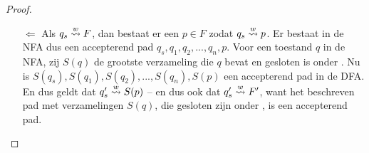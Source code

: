 \documentclass[../aanvullingen_cursus.tex]{subfiles}
\begin{document}
\begin{proof}
\begin{enumerate}
		\item[\(\Leftarrow\)] Als \(q_s \overset{w}{\rightsquigarrow} F\), dan bestaat er een \(p \in F\) zodat \(q_s \overset{w}{\rightsquigarrow} p\). Er bestaat in de NFA dus een accepterend pad \(q_s, q_1, q_2, ..., q_n, p\). Voor een toestand \( q \) in de NFA, zij \(S(q)\) de grootste verzameling die \(q\) bevat en gesloten is onder \epsilonbogen. Nu is \(S(q_s), S(q_1), S(q_2), ..., S(q_n), S(p)\) een accepterend pad in de DFA. En dus geldt dat \(q_{s}' \overset{w}{\rightsquigarrow} S(p)\) -- en dus ook dat \(q_{s}' \overset{w}{\rightsquigarrow} F'\), want het beschreven pad met verzamelingen \(S(q)\), die gesloten zijn onder \epsilonbogen, is een accepterend pad.
	\end{enumerate}

\end{proof}
\end{document}
